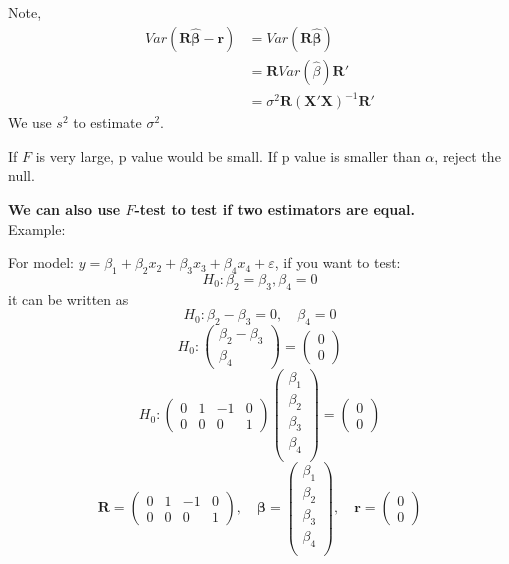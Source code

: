 \documentclass[12pt]{article}
\begin{document}
Note, 
\begin{align*}
		Var(\bm{R  \widehat{\beta} - r})&= Var(\bm{R  \widehat{\beta}})\\
		&= \bm{R}Var( \widehat{\beta})\bm{R}'\\
		&= \sigma^{2}\bm{R}(\bm{X'X})^{ - 1}\bm{R}'
\end{align*}
We use $ s^{2} $ to estimate $ \sigma^{2} $.

If $ F $ is very large, p value would be small. If p value is smaller than $ \alpha $,
reject the null.

{\textbf {We can also use $ F $-test to test if two estimators are equal.}}\\

Example:

For model: $ y = \beta_1 + \beta_2x_2 + \beta_3x_3 + \beta_4x_4 + \varepsilon $,
if you want to test:
\begin{equation*}
H_0: \beta_2 = \beta_3, \beta_4 = 0
\end{equation*}
it can be written as
\begin{equation*}
H_0: \beta_2 - \beta_3 = 0, \quad \beta_4 = 0
\end{equation*}
\begin{equation*}
H_0:
\begin{pmatrix}
\beta_2 - \beta_3\\
\beta_4
\end{pmatrix}
=
\begin{pmatrix}
0\\
0
\end{pmatrix}
\end{equation*}
\begin{equation*}
H_0:
\begin{pmatrix}
0 & 1 &  -1 & 0\\
0 & 0 &  0 & 1
\end{pmatrix}
\begin{pmatrix}
\beta_1\\
\beta_2\\
\beta_3\\
\beta_4\\
\end{pmatrix}
=
\begin{pmatrix}
0\\
0
\end{pmatrix}
\end{equation*}
\begin{equation*}
\bm{R} = 
\begin{pmatrix}
0 & 1 &  -1 & 0\\
0 & 0 &  0 & 1
\end{pmatrix}
, \quad
\bm{\beta} = 
\begin{pmatrix}
\beta_1\\
\beta_2\\
\beta_3\\
\beta_4\\
\end{pmatrix}
, \quad
\bm{r} = 
\begin{pmatrix}
0\\
0
\end{pmatrix}
\end{equation*}
\end{document}
